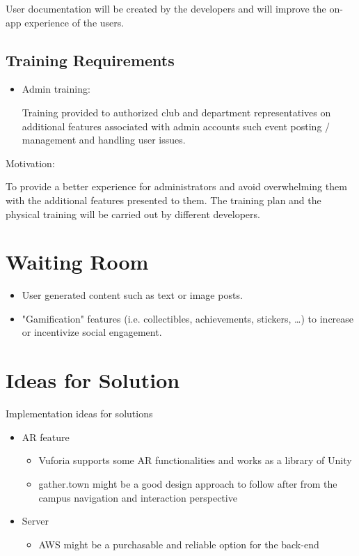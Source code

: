 \documentclass[12pt]{article}
\begin{document}
User documentation will be created by the developers and will improve the on-app experience of the users.


\subsection{Training Requirements}

\begin{itemize}
\item Admin training: 

Training provided to authorized club and department representatives on additional features associated with admin accounts such event posting / management and handling user issues.
\end{itemize}
Motivation: 

To provide a better experience for administrators and avoid overwhelming them with the additional features presented to them. The training plan and the physical training will be carried out by different developers.

\section{Waiting Room}
\begin{itemize}
  \item User generated content such as text or image posts.
  \item "Gamification" features (i.e. collectibles, achievements, stickers, \dots) to increase or incentivize social engagement.
\end{itemize}
\section{Ideas for Solution}
Implementation ideas for solutions
\begin{itemize}
\item AR feature
	\begin{itemize}
	\item Vuforia supports some AR functionalities and works as a library of Unity
	\item gather.town might be a good design approach to follow after from the campus navigation and interaction perspective
	\end{itemize}
\item Server
	\begin{itemize}
	\item AWS might be a purchasable and reliable option for the back-end
	\end{itemize}
\end{itemize}
\end{document}
